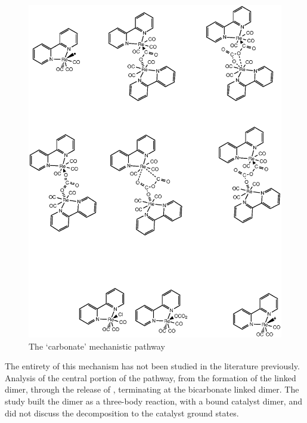 \begin{figure}[!htb]
 \begin{center}
  \includegraphics[clip=true, width=120mm, keepaspectratio]{images/carbonate.eps}
 \end{center}
\caption{The `carbonate' mechanistic pathway}
\label{fig.carbonate}
\end{figure} 

The entirety of this mechanism has not been studied in the literature previously. Analysis of the central portion of the pathway, from the formation of the  linked dimer, through the release of , terminating at the bicarbonate linked dimer. The study built the dimer as a three-body reaction, with a  bound catalyst dimer, and did not discuss the decomposition to the catalyst ground states. 

